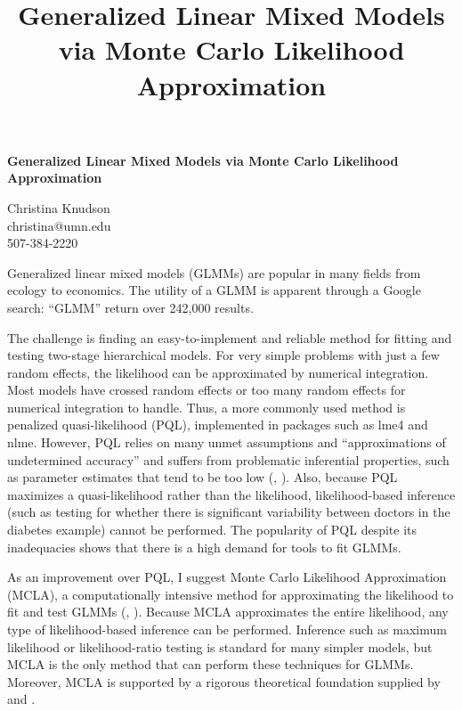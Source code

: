 \documentclass[12pt]{article}
\title{Generalized Linear Mixed Models via Monte Carlo Likelihood Approximation}
\author{}
\date{}
\newcommand{\ncite}[1]{\citeauthor{#1}, \citeyear{#1}}
\begin{document}
 \centerline{\large \bf Generalized Linear Mixed Models via Monte Carlo Likelihood Approximation} %

 \medskip

 \centerline{Christina Knudson\\
christina@umn.edu\\
507-384-2220}
 \smallskip
{}

Generalized linear mixed models (GLMMs) are popular in many fields from ecology to economics. The utility of a GLMM is apparent through a Google search: ``GLMM'' return over 242,000 results.


The challenge is finding an easy-to-implement and reliable method for fitting and testing two-stage hierarchical models. For very simple problems with just a few random effects, the likelihood can be approximated by numerical integration.  Most models have crossed random effects or too many random effects for numerical integration to handle. Thus, a more commonly used method is penalized quasi-likelihood (PQL), implemented in packages such as lme4 and nlme. However, PQL relies on many unmet assumptions and ``approximations of undetermined accuracy'' and suffers from problematic inferential properties, such as parameter estimates that tend to be too low (\ncite{mccu:sear:2001}). Also, because PQL maximizes a quasi-likelihood rather than the likelihood,  likelihood-based inference (such as testing for whether there is significant variability between doctors in the diabetes example) cannot be performed.  The popularity of PQL despite its inadequacies shows that there is a high demand for tools to fit GLMMs.


As an improvement over PQL, I suggest  Monte Carlo  Likelihood Approximation (MCLA), a computationally intensive method for approximating the likelihood to fit and test GLMMs (\ncite{geyer:thom:1992}).   Because MCLA approximates the entire likelihood, any type of likelihood-based inference can be performed.  Inference such as maximum likelihood or likelihood-ratio testing is standard for many simpler models, but MCLA is the only method that can perform these techniques for GLMMs.  Moreover, MCLA is supported by a rigorous theoretical foundation supplied by \citet{geyer:1994} and  \citet{sung:geyer:2007}. 
\end{document}
